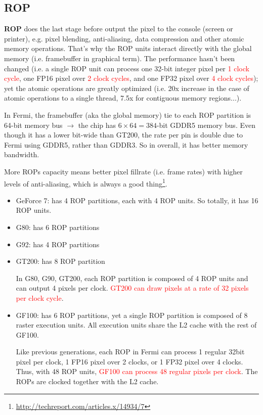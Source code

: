 \subsection{ROP}
\label{sec:rop}

{\bf ROP} does the last stage before output the pixel to the console
(screen or printer), e.g.  pixel blending, anti-aliasing, data
compression and other atomic memory operations. That's why the ROP
units interact directly with the global memory (i.e. framebuffer in
graphical term). The performance hasn't been changed (i.e. a single
ROP unit can process one 32-bit integer pixel per
\textcolor{red}{1 clock cycle}, one FP16 pixel over
\textcolor{red}{2 clock cycles}, and one FP32 pixel over
\textcolor{red}{4 clock cycles}); yet the atomic operations are
greatly optimized (i.e. 20x increase in the case of atomic operations
to a single thread, 7.5x for contiguous memory regions...).

\begin{framed}
  In Fermi, the framebuffer (aka the global memory) tie to each ROP
  partition is 64-bit memory bus $\rightarrow$ the chip has $6\times
  64=384$-bit GDDR5 memory bus. Even though it has a lower bit-wide
  than GT200, the rate per pin is double due to Fermi using GDDR5,
  rather than GDDR3. So in overall, it has better memory bandwidth.
\end{framed}

More ROPs capacity means better pixel fillrate (i.e. frame rates) with
higher levels of anti-aliasing, which is always a good
thing\footnote{\url{http://techreport.com/articles.x/14934/7}}.
\begin{itemize}
\item GeForce 7: has 4 ROP partitions, each with 4 ROP units. So
  totally, it has 16 ROP units.
\item G80: has 6 ROP partitions
\item G92: has 4 ROP partitions
\item GT200: has 8 ROP partition 

  In G80, G90, GT200, each ROP partition is composed of 4 ROP units
  and can output 4 pixels per clock.
  \textcolor{red}{ GT200 can draw pixels at a rate of 32 pixels per
    clock cycle}.

\item GF100: has 6 ROP partitions, yet a single ROP partition is
  composed of 8 raster execution units. All execution units share the
  L2 cache with the rest of GF100.

  Like previous generations, each ROP in Fermi can process 1 regular
  32bit pixel per clock, 1 FP16 pixel over 2 clocks, or 1 FP32 pixel
  over 4 clocks. Thus, with 48 ROP units,
  \textcolor{red}{GF100 can process 48 regular pixels per clock}. The
  ROPs are clocked together with the L2 cache.
\end{itemize}

